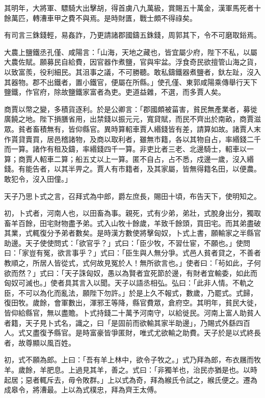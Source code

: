\begin{pinyinscope}
其明年，大將軍、驃騎大出擊胡，得首虜八九萬級，賞賜五十萬金，漢軍馬死者十餘萬匹，轉漕車甲之費不與焉。是時財匱，戰士頗不得祿矣。

有司言三銖錢輕，易姦詐，乃更請諸郡國鑄五銖錢，周郭其下，令不可磨取鋊焉。

大農上鹽鐵丞孔僅、咸陽言：「山海，天地之藏也，皆宜屬少府，陛下不私，以屬大農佐賦。願募民自給費，因官器作煮鹽，官與牢盆。浮食奇民欲擅管山海之貨，以致富羨，役利細民。其沮事之議，不可勝聽。敢私鑄鐵器煮鹽者，釱左趾，沒入其器物。郡不出鐵者，置小鐵官，便屬在所縣。」使孔僅、東郭咸陽乘傳舉行天下鹽鐵，作官府，除故鹽鐵家富者為吏。吏道益雜，不選，而多賈人矣。

商賈以幣之變，多積貨逐利。於是公卿言：「郡國頗被菑害，貧民無產業者，募徙廣饒之地。陛下損膳省用，出禁錢以振元元，寬貸賦，而民不齊出於南畝，商賈滋眾。貧者畜積無有，皆仰縣官。異時算軺車賈人緡錢皆有差，請算如故。諸賈人末作貰貸賣買，居邑稽諸物，及商以取利者，雖無市籍，各以其物自占，率緡錢二千而一算。諸作有租及鑄，率緡錢四千一算。非吏比者三老、北邊騎士，軺車以一算；商賈人軺車二算；船五丈以上一算。匿不自占，占不悉，戍邊一歲，沒入緡錢。有能告者，以其半畀之。賈人有市籍者，及其家屬，皆無得籍名田，以便農。敢犯令，沒入田僮。」

天子乃思卜式之言，召拜式為中郎，爵左庶長，賜田十頃，布告天下，使明知之。

初，卜式者，河南人也，以田畜為事。親死，式有少弟，弟壯，式脫身出分，獨取畜羊百餘，田宅財物盡予弟。式入山牧十餘歲，羊致千餘頭，買田宅。而其弟盡破其業，式輒復分予弟者數矣。是時漢方數使將擊匈奴，卜式上書，願輸家之半縣官助邊。天子使使問式：「欲官乎？」式曰：「臣少牧，不習仕宦，不願也。」使問曰：「家豈有冤，欲言事乎？」式曰：「臣生與人無分爭。式邑人貧者貸之，不善者教順之，所居人皆從式，式何故見冤於人！無所欲言也。」使者曰：「茍如此，子何欲而然？」式曰：「天子誅匈奴，愚以為賢者宜死節於邊，有財者宜輸委，如此而匈奴可滅也。」使者具其言入以聞。天子以語丞相弘。弘曰：「此非人情。不軌之臣，不可以為化而亂法，願陛下勿許。」於是上久不報式，數歲，乃罷式。式歸，復田牧。歲餘，會軍數出，渾邪王等降，縣官費眾，倉府空。其明年，貧民大徙，皆仰給縣官，無以盡贍。卜式持錢二十萬予河南守，以給徙民。河南上富人助貧人者籍，天子見卜式名，識之，曰「是固前而欲輸其家半助邊」，乃賜式外繇四百人。式又盡復予縣官。是時富豪皆爭匿財，唯式尤欲輸之助費。天子於是以式終長者，故尊顯以風百姓。

初，式不願為郎。上曰：「吾有羊上林中，欲令子牧之。」式乃拜為郎，布衣屩而牧羊。歲餘，羊肥息。上過見其羊，善之。式曰：「非獨羊也，治民亦猶是也。以時起居；惡者輒斥去，毋令敗群。」上以式為奇，拜為緱氏令試之，緱氏便之。遷為成皋令，將漕最。上以為式樸忠，拜為齊王太傅。


\end{pinyinscope}
